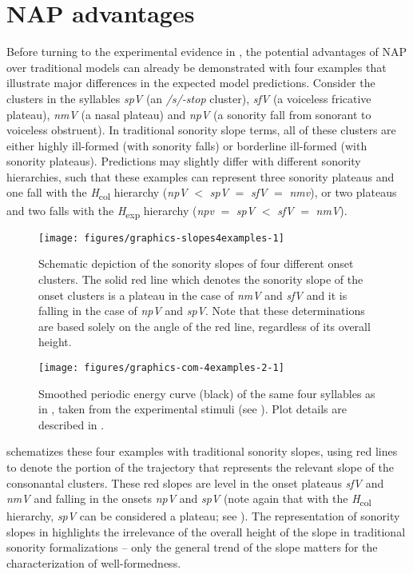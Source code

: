 \section{NAP advantages}\label{sec:advantages}

Before turning to the experimental evidence in , the potential advantages of NAP over traditional models can already be demonstrated with four examples that illustrate major differences in the expected model predictions. Consider the clusters in the syllables \emph{spV} (an \emph{/s/-stop} cluster), \emph{sfV} (a voiceless fricative plateau), \emph{nmV} (a nasal plateau) and \emph{npV} (a sonority fall from sonorant to voiceless obstruent). In traditional sonority slope terms, all of these clusters are either highly ill-formed (with sonority falls) or borderline ill-formed (with sonority plateaus). Predictions may slightly differ with different sonority hierarchies, such that these examples can represent three sonority plateaus and one fall with the \emph{H}\textsubscript{col} hierarchy
(\emph{npV} \(<\) \emph{spV} \(=\) \emph{sfV} \(=\) \emph{nmv}),
or two plateaus and two falls with the \emph{H}\textsubscript{exp} hierarchy
(\emph{npv} \(=\) \emph{spV} \(<\) \emph{sfV} \(=\) \emph{nmV}).



\begin{figure}
\texttt{[image: figures/graphics-slopes4examples-1]}
\caption{Schematic depiction of the sonority slopes of four different onset clusters. The solid red line which denotes the sonority slope of the onset clusters is a plateau in the case of \emph{nmV} and \emph{sfV} and it is falling in the case of \emph{npV} and \emph{spV}. Note that these determinations are based solely on the angle of the red line, regardless of its overall height.}\label{fig:slopes4examples}
\end{figure}



\begin{figure}
\texttt{[image: figures/graphics-com-4examples-2-1]}
\caption{Smoothed periodic energy curve (black) of the same four syllables as in , taken from the experimental stimuli (see ). Plot details are described in .}\label{fig:com-4examples-2}
\end{figure}

 schematizes these four examples with traditional sonority slopes, using red lines to denote the portion of the trajectory that represents the relevant slope of the consonantal clusters. These red slopes are level in the onset plateaus \emph{sfV} and \emph{nmV} and falling in the onsets \emph{npV} and \emph{spV} (note again that with the \emph{H}\textsubscript{col} hierarchy, \emph{spV} can be considered a plateau; see ).
The representation of sonority slopes in  highlights the irrelevance of the
overall height of the slope in traditional sonority formalizations -- only the general trend of the slope matters for the characterization of well-formedness.

